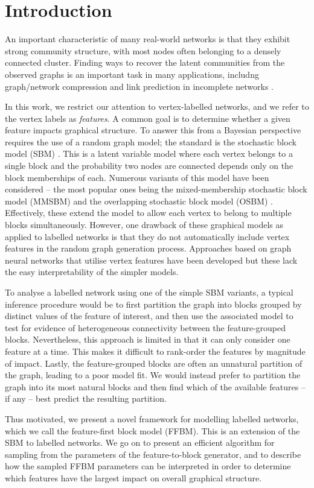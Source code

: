 \section{Introduction}

An important characteristic of many real-world networks is that they exhibit strong community structure, with most nodes often belonging to a densely connected cluster. 
Finding ways to recover the latent communities from the observed graphs is an important
task in many applications, includng
graph/network compression \cite{cluster-compression} and link prediction in 
incomplete networks \cite{link-prediction}.

In this work, we
restrict our attention to vertex-labelled networks, and we
refer to the vertex labels as {\em features}. A common goal is to determine whether a given feature impacts graphical structure. To answer this from a Bayesian perspective requires the use of a random graph model; the standard is the stochastic block model (SBM) \cite{vanilla-sbm}. This is a latent variable model where each vertex belongs to a single block and the probability two nodes are connected depends only on the block memberships of each. Numerous variants of this 
model have been considered -- the most popular ones being the mixed-membership stochastic block model (MMSBM) \cite{mixed-membership-sbm} and the overlapping stochastic block model (OSBM) \cite{overlapping-sbm}. Effectively, these extend the model to allow each vertex to belong to multiple blocks simultaneously. However, one drawback of these graphical models as applied to labelled networks is that they do not automatically include vertex features in the random graph generation process. Approaches based on graph neural networks \cite{sbm-gnn} that utilise vertex features have been developed but these lack the easy interpretability of the simpler models.

To analyse a labelled network using one of the simple SBM variants, a typical inference procedure would be to first partition the graph into blocks grouped by distinct values of the feature of interest, and then use the associated model to test for evidence of heterogeneous connectivity between the feature-grouped blocks. Nevertheless, this approach is limited in that it can only consider one feature at a time. This makes it difficult to rank-order the features by  magnitude of impact. Lastly, the feature-grouped blocks are often an unnatural partition of the graph, leading to a poor model fit. We would instead prefer to partition the graph into its most natural blocks and then find which of the available features -- if any -- best predict the resulting partition.

Thus motivated, we present a novel framework for modelling labelled networks, which we call the feature-first block model (FFBM). This is an extension of the SBM to labelled networks. We go on to present an efficient algorithm for sampling from the parameters of the feature-to-block generator, and to describe how the 
sampled FFBM parameters can be interpreted in order to determine which features have the largest impact on overall graphical structure.

